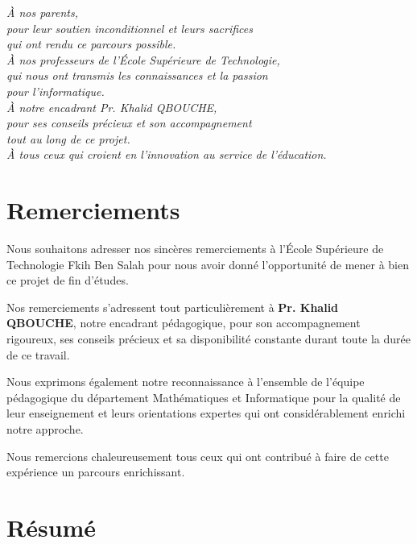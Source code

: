 \documentclass[12pt, a4paper]{report}
\begin{document}
\begin{flushright}
  \itshape
  À nos parents,\\
  pour leur soutien inconditionnel et leurs sacrifices\\
  qui ont rendu ce parcours possible.\\[1em]
  À nos professeurs de l'École Supérieure de Technologie,\\
  qui nous ont transmis les connaissances et la passion\\
  pour l'informatique.\\[1em]
  À notre encadrant Pr. Khalid QBOUCHE,\\
  pour ses conseils précieux et son accompagnement\\
  tout au long de ce projet.\\[1em]
  À tous ceux qui croient en l'innovation au service de l'éducation.
\end{flushright}

\newpage

\chapter*{Remerciements}
\thispagestyle{plain}

Nous souhaitons adresser nos sincères remerciements à l'École Supérieure de Technologie
Fkih Ben Salah pour nous avoir donné l'opportunité de mener à bien ce projet de fin d'études.

Nos remerciements s'adressent tout particulièrement à \textbf{Pr. Khalid QBOUCHE},
notre encadrant pédagogique, pour son accompagnement rigoureux, ses conseils précieux et
sa disponibilité constante durant toute la durée de ce travail.

Nous exprimons également notre reconnaissance à l'ensemble de l'équipe pédagogique du
département Mathématiques et Informatique pour la qualité de leur enseignement et leurs
orientations expertes qui ont considérablement enrichi notre approche.

Nous remercions chaleureusement tous ceux qui ont contribué à faire de cette expérience
un parcours enrichissant.

\newpage

\chapter*{Résumé}
\thispagestyle{plain}
\end{document}
